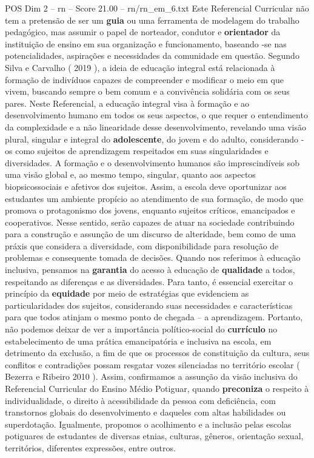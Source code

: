 \begin{textsample}{POS Dim 2 – rn – Score 21.00 – rn/rn\_em\_6.txt}
Este Referencial Curricular não tem a pretensão de ser um \textbf{guia} ou uma ferramenta de modelagem do trabalho pedagógico, mas assumir o papel de norteador, condutor e \textbf{orientador} da instituição de ensino em sua organização e funcionamento, baseando -se nas potencialidades, aspirações e necessidades da comunidade em questão.
Segundo Silva e Carvalho ( 2019 ), a ideia de educação integral está relacionada à formação de indivíduos capazes de compreender e modificar o meio em que vivem, buscando sempre o bem comum e a convivência solidária com os seus pares.
Neste Referencial, a educação integral visa à formação e ao desenvolvimento humano em todos os seus aspectos, o que requer o entendimento da complexidade e a não linearidade desse desenvolvimento, revelando uma visão plural, singular e integral do \textbf{adolescente}, do jovem e do adulto, considerando -os como sujeitos de aprendizagem respeitados em suas singularidades e diversidades.
A formação e o desenvolvimento humanos são imprescindíveis sob uma visão global e, ao mesmo tempo, singular, quanto aos aspectos biopsicossociais e afetivos dos sujeitos.
Assim, a escola deve oportunizar aos estudantes um ambiente propício ao atendimento de sua formação, de modo que promova o protagonismo dos jovens, enquanto sujeitos críticos, emancipados e cooperativos.
Nesse sentido, serão capazes de atuar na sociedade contribuindo para a construção e assunção de um discurso de alteridade, bem como de uma práxis que considera a diversidade, com disponibilidade para resolução de problemas e consequente tomada de decisões.
Quando nos referimos à educação inclusiva, pensamos na \textbf{garantia} do acesso à educação de \textbf{qualidade} a todos, respeitando as diferenças e as diversidades.
Para tanto, é essencial exercitar o princípio da \textbf{equidade} por meio de estratégias que evidenciem as particularidades dos sujeitos, considerando suas necessidades e características para que todos atinjam o mesmo ponto de chegada – a aprendizagem.
Portanto, não podemos deixar de ver a importância político-social do \textbf{currículo} no estabelecimento de uma prática emancipatória e inclusiva na escola, em detrimento da exclusão, a fim de que os processos de constituição da cultura, seus conflitos e contradições possam resgatar vozes silenciadas no território escolar ( Bezerra e Ribeiro 2010 ).
Assim, confirmamos a assunção da visão inclusiva do Referencial Curricular do Ensino Médio Potiguar, quando \textbf{preconiza} o respeito à individualidade, o direito à acessibilidade da pessoa com deficiência, com transtornos globais do desenvolvimento e daqueles com altas habilidades ou superdotação.
Igualmente, propomos o acolhimento e a inclusão pelas escolas potiguares de estudantes de diversas etnias, culturas, gêneros, orientação sexual, territórios, diferentes expressões, entre outros.

\end{textsample}
